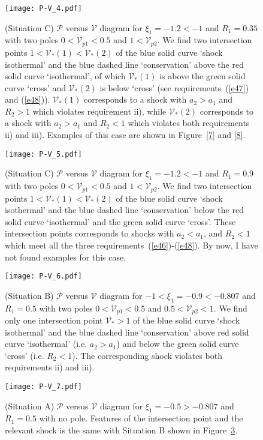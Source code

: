 \documentclass[fleqn,usenatbib]{mnras}
\begin{document}
\begin{figure}
\centering
\texttt{[image: P-V\_4.pdf]}
\caption{(Situation C) $\mathcal{P}$ versus $\mathcal{V}$ diagram for $\xi_{1}=-1.2<-1$ and $R_{1}=0.35$ with two poles $0<\mathcal{V}_{p1}<0.5$ and $1<\mathcal{V}_{p2}$. We find two intersection points $1<\mathcal{V}_{*}(1)<\mathcal{V}_{*}(2)$ of the blue solid curve `shock isothermal' and the blue dashed line `conservation' above the red solid curve `isothermal', of which $\mathcal{V}_{*}(1)$ is above the green solid curve `cross' and $\mathcal{V}_{*}(2)$ is below `cross' (see requirements~(\ref{e47}) and (\ref{e48})). $\mathcal{V}_{*}(1)$ corresponds to a shock with $a_{2}>a_{1}$ and $R_{2}>1$ which violates requirement ii), while $\mathcal{V}_{*}(2)$ corresponds to a shock with $a_{2}>a_{1}$ and $R_{2}<1$ which violates both requirements ii) and iii). Examples of this case are shown in Figure~\ref{7} and \ref{8}.}
\label{3}
\end{figure}

\begin{figure}
\centering
\texttt{[image: P-V\_5.pdf]}
\caption{(Situation C) $\mathcal{P}$ versus $\mathcal{V}$ diagram for $\xi_{1}=-1.2<-1$ and $R_{1}=0.9$ with two poles $0<\mathcal{V}_{p1}<0.5$ and $1<\mathcal{V}_{p2}$. We find two intersection points $1<\mathcal{V}_{*}(1)<\mathcal{V}_{*}(2)$ of the blue solid curve `shock isothermal' and the blue dashed line `conservation' below the red solid curve `isothermal' and the green solid curve `cross'. These intersection points corresponds to shocks with $a_{2}<a_{1}$, and $R_{2}<1$ which meet all the three requirements~(\ref{e46})-(\ref{e48}). By now, I have not found examples for this case.}
\label{4}
\end{figure}

\begin{figure}
\centering
\texttt{[image: P-V\_6.pdf]}
\caption{(Situation B) $\mathcal{P}$ versus $\mathcal{V}$ diagram for $-1<\xi_{1}=-0.9<-0.807$ and $R_{1}=0.5$ with two poles $0<\mathcal{V}_{p1}<0.5$ and $0.5<\mathcal{V}_{p2}<1$. We find only one intersection point $\mathcal{V}_{*}>1$ of the blue solid curve `shock isothermal' and the blue dashed line `conservation' above red solid curve `isothermal' (i.e. $a_{2}>a_{1}$) and below the green solid curve `cross' (i.e. $R_{2}<1$). The corresponding shock violates both requirements ii) and iii).}
\label{5}
\end{figure}

\begin{figure}
\centering
\texttt{[image: P-V\_7.pdf]}
\caption{(Situation A) $\mathcal{P}$ versus $\mathcal{V}$ diagram for $\xi_{1}=-0.5>-0.807$ and $R_{1}=0.5$ with no pole. Features of the intersection point and the relevant shock is the same with Situation B shown in Figure~\ref{5}.}
\label{6}
\end{figure}
\end{document}
